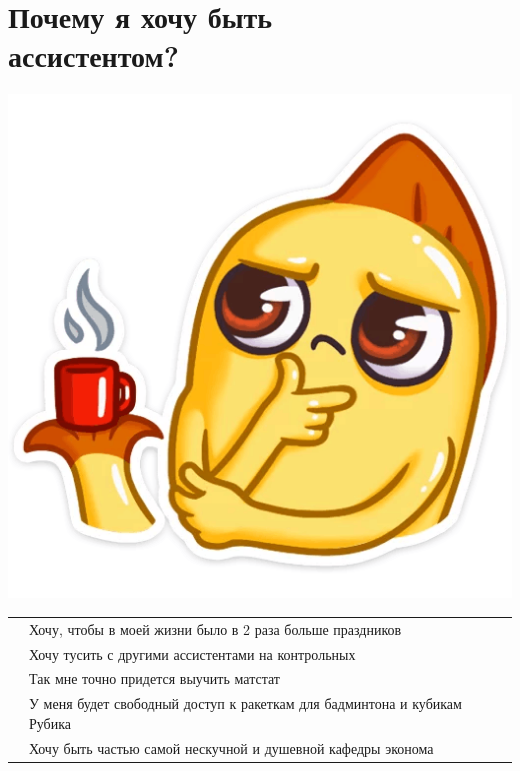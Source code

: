 \documentclass[12pt,a4paper]{article}
\begin{document}
\parbox[t][0.6\paperheight][t]{0.45\linewidth}{
    \vspace*{0.5cm}
    \section{Почему я хочу быть \\ ассистентом?}
    
    {\begin{flushright}
    \includegraphics[width=0.5\linewidth]{hmm.png}
    \end{flushright}
    \vspace*{1cm}
    \begin{tabular}{p{0.01cm}p{8cm}}
         & Хочу, чтобы в моей жизни было в 2 раза больше праздников\\[2mm]
         & Хочу тусить с другими ассистентами на контрольных \\[2mm]
         & Так мне точно придется выучить матстат \\[2mm]
         & У меня будет свободный доступ к ракеткам для бадминтона и кубикам Рубика \\[2mm]
         & Хочу быть частью самой нескучной и душевной кафедры эконома \\[2mm]
    \end{tabular}
    }
}

\end{document}
